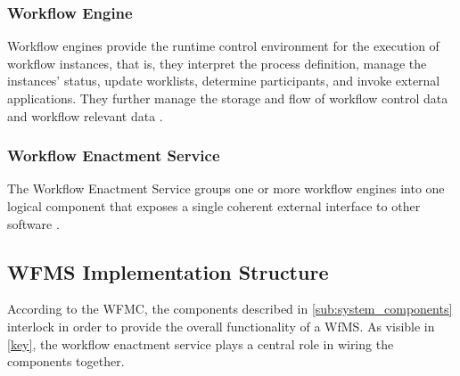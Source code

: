     \subsubsection{Workflow Engine} %
    \label{ssub:workflow_engine} 
      Workflow engines provide the runtime control environment for the execution of workflow instances, that is, they interpret the process definition, manage the instances' status, update worklists, determine participants, and invoke external applications. They further manage the storage and flow of workflow control data and workflow relevant data \cite{Hollingsworth1995Wfmc}.

    \subsubsection{Workflow Enactment Service} %
    \label{ssub:workflow_enactment_service}
      The Workflow Enactment Service groups one or more workflow engines into one logical component that exposes a single coherent external interface to other software \cite{Hollingsworth1995Wfmc}.

  \subsection{WFMS Implementation Structure} %
  \label{sub:wfms_implementation_structure}
    According to the \ac{WFMC}, the components described in \ref{sub:system_components} interlock in order to provide the overall functionality of a \ac{WfMS}. As visible in \ref{key}, the workflow enactment service plays a central role in wiring the components together.
  

